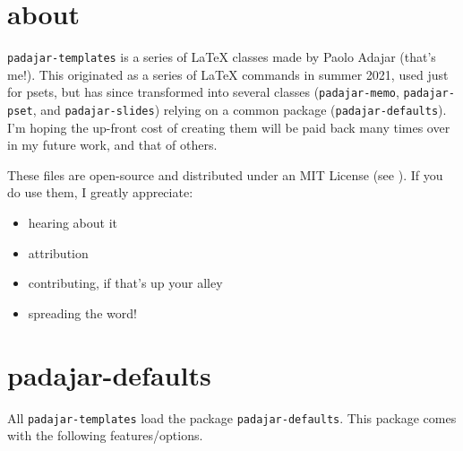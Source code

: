 \documentclass[11pt]{padajar-memo}
\date         {\today}
\begin{document}
\section*{about}

\texttt{padajar-templates} is a series of \LaTeX{} classes made by Paolo Adajar (that's me!). This originated as a series of \LaTeX{} commands in summer 2021, used just for psets, but has since transformed into several classes (\texttt{padajar-memo}, \texttt{padajar-pset}, and \texttt{padajar-slides}) relying on a common package (\texttt{padajar-defaults}). I'm hoping the up-front cost of creating them will be paid back many times over in my future work, and that of others.

These files are open-source and distributed under an MIT License (see ). If you do use them, I greatly appreciate:
\begin{itemize}
	\item hearing about it
	\item attribution
	\item contributing, if that's up your alley
	\item spreading the word!
\end{itemize}

\renewcommand{\contentsname}{contents}
\tableofcontents

\clearpage

\section{padajar-defaults}
All \texttt{padajar-templates} load the package \texttt{padajar-defaults}. This package comes with the following features/options.
\end{document}
